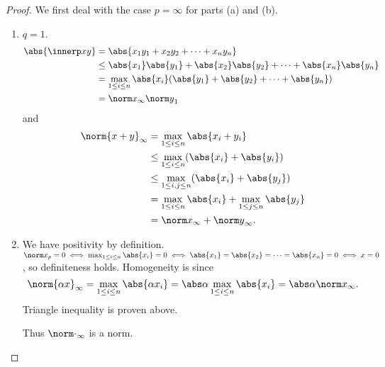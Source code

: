 \documentclass[12pt]{article}
\begin{document}
\begin{proof} \leavevmode
    We first deal with the case $p = \infty$ for parts (a) and (b).
    \begin{enumerate}
        \item $q = 1$.
        \begin{align*}
            \abs{\innerp xy} &= \abs{x_1 y_1 + x_2 y_2 + \dots + x_n y_n} \\
            &\le \abs{x_1} \abs{y_1} + \abs{x_2} \abs{y_2} + \dots + \abs{x_n} \abs{y_n} \\
            &= \max_{1 \le i \le n} \abs{x_i} (\abs{y_1} + \abs{y_2} + \dots + \abs{y_n}) \\
            &= {\norm x}_\infty {\norm y}_1
        \end{align*} and \begin{align*}
            {\norm {x + y}}_\infty &= \max_{1 \le i \le n} \abs{x_i + y_i} \\
            &\le \max_{1 \le i \le n} (\abs{x_i} + \abs{y_i}) \\
            &\le \max_{1 \le i, j \le n} (\abs{x_i} + \abs{y_j}) \\
            &= \max_{1 \le i \le n} \abs{x_i} + \max_{1 \le j \le n} \abs{y_j} \\
            &= {\norm x}_\infty + {\norm y}_\infty.
        \end{align*}
        \item We have positivity by definition.
        ${\norm x}_p = 0 \iff \max_{1 \le i \le n} \abs{x_i} = 0 \iff
        \abs{x_1} = \abs{x_2} = \dots = \abs{x_n} = 0 \iff x = 0$, so
        definiteness holds.
        Homogeneity is since \[
            {\norm{\alpha x}}_\infty = \max_{1 \le i \le n} \abs{\alpha x_i}
            = \abs\alpha \max_{1 \le i \le n} \abs{x_i}
            = \abs\alpha {\norm x}_\infty.
        \] Triangle inequality is proven above.

        Thus ${\norm \cdot}_\infty$ is a norm.
    \end{enumerate}


\end{proof}
\end{document}
